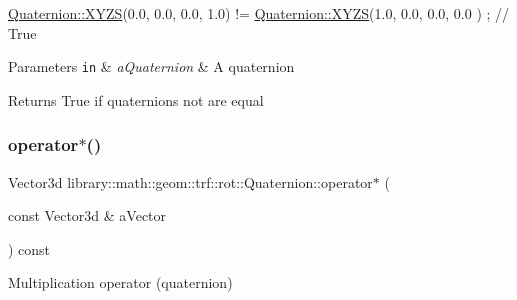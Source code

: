 \begin{DoxyCode}
\hyperlink{classlibrary_1_1math_1_1geom_1_1trf_1_1rot_1_1_quaternion_ad6426210c54c79fc5296b5375380a7ca}{Quaternion::XYZS}(0.0, 0.0, 0.0, 1.0) != \hyperlink{classlibrary_1_1math_1_1geom_1_1trf_1_1rot_1_1_quaternion_ad6426210c54c79fc5296b5375380a7ca}{Quaternion::XYZS}(1.0, 0.0, 0.0, 0.0
      ) ; \textcolor{comment}{// True}
\end{DoxyCode}



\begin{DoxyParams}[1]{Parameters}
\mbox{\tt in}  & {\em a\+Quaternion} & A quaternion \\
\hline
\end{DoxyParams}
\begin{DoxyReturn}{Returns}
True if quaternions not are equal 
\end{DoxyReturn}
\mbox{\label{classlibrary_1_1math_1_1geom_1_1trf_1_1rot_1_1_quaternion_a6591efb9050f24e2b9d5c440dfeecc5f}} 
\subsubsection{\texorpdfstring{operator$\ast$()}{operator*()}}
{\footnotesize\ttfamily Vector3d library\+::math\+::geom\+::trf\+::rot\+::\+Quaternion\+::operator$\ast$ (\begin{DoxyParamCaption}\item[{const Vector3d \&}]{a\+Vector }\end{DoxyParamCaption}) const}



Multiplication operator (quaternion) 


